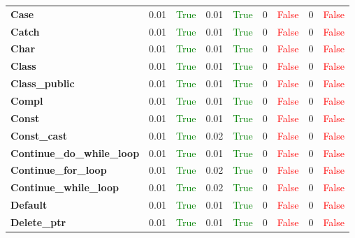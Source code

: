 \documentclass{article}
\begin{document}
\begin{xltabular}{\textwidth}{lcccccccc}
\textbf{{\fontsize{10}{12}\selectfont Case}}& 0.01&\textcolor{green}{True}& 0.01&\textcolor{green}{True}& 0&\textcolor{red}{False}& 0&\textcolor{red}{False} \\[0.5ex]
\textbf{{\fontsize{10}{12}\selectfont Catch}}& 0.01&\textcolor{green}{True}& 0.01&\textcolor{green}{True}& 0&\textcolor{red}{False}& 0&\textcolor{red}{False} \\[0.5ex]
\textbf{{\fontsize{10}{12}\selectfont Char}}& 0.01&\textcolor{green}{True}& 0.01&\textcolor{green}{True}& 0&\textcolor{red}{False}& 0&\textcolor{red}{False} \\[0.5ex]
\textbf{{\fontsize{10}{12}\selectfont Class}}& 0.01&\textcolor{green}{True}& 0.01&\textcolor{green}{True}& 0&\textcolor{red}{False}& 0&\textcolor{red}{False} \\[0.5ex]
\textbf{{\fontsize{10}{12}\selectfont Class\_public}}& 0.01&\textcolor{green}{True}& 0.01&\textcolor{green}{True}& 0&\textcolor{red}{False}& 0&\textcolor{red}{False} \\[0.5ex]
\textbf{{\fontsize{10}{12}\selectfont Compl}}& 0.01&\textcolor{green}{True}& 0.01&\textcolor{green}{True}& 0&\textcolor{red}{False}& 0&\textcolor{red}{False} \\[0.5ex]
\textbf{{\fontsize{10}{12}\selectfont Const}}& 0.01&\textcolor{green}{True}& 0.01&\textcolor{green}{True}& 0&\textcolor{red}{False}& 0&\textcolor{red}{False} \\[0.5ex]
\textbf{{\fontsize{10}{12}\selectfont Const\_cast}}& 0.01&\textcolor{green}{True}& 0.02&\textcolor{green}{True}& 0&\textcolor{red}{False}& 0&\textcolor{red}{False} \\[0.5ex]
\textbf{{\fontsize{10}{12}\selectfont Continue\_do\_while\_loop}}& 0.01&\textcolor{green}{True}& 0.01&\textcolor{green}{True}& 0&\textcolor{red}{False}& 0&\textcolor{red}{False} \\[0.5ex]
\textbf{{\fontsize{10}{12}\selectfont Continue\_for\_loop}}& 0.01&\textcolor{green}{True}& 0.02&\textcolor{green}{True}& 0&\textcolor{red}{False}& 0&\textcolor{red}{False} \\[0.5ex]
\textbf{{\fontsize{10}{12}\selectfont Continue\_while\_loop}}& 0.01&\textcolor{green}{True}& 0.02&\textcolor{green}{True}& 0&\textcolor{red}{False}& 0&\textcolor{red}{False} \\[0.5ex]
\textbf{{\fontsize{10}{12}\selectfont Default}}& 0.01&\textcolor{green}{True}& 0.01&\textcolor{green}{True}& 0&\textcolor{red}{False}& 0&\textcolor{red}{False} \\[0.5ex]
\textbf{{\fontsize{10}{12}\selectfont Delete\_ptr}}& 0.01&\textcolor{green}{True}& 0.01&\textcolor{green}{True}& 0&\textcolor{red}{False}& 0&\textcolor{red}{False} \\[0.5ex]

\end{xltabular}
\end{document}
